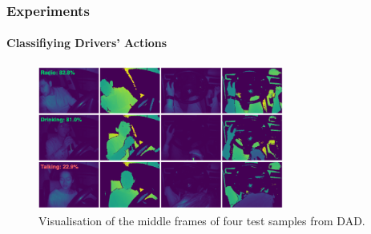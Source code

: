 \begin{frame}
\frametitle{Experiments}
\framesubtitle{Classifiying Drivers' Actions}

{
\begin{figure}
    \centering
    \includegraphics[width=0.72\textwidth]{images/vis.png}
    \caption{Visualisation of the middle frames of four test samples from DAD.}
    \label{fig:7}
\end{figure}
}

\end{frame}




